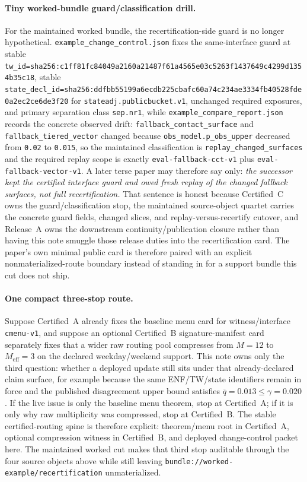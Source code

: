 \documentclass[11pt]{article}
\begin{document}
\paragraph{Tiny worked-bundle guard/classification drill.}
For the maintained worked bundle, the recertification-side guard is no longer hypothetical.
\texttt{example\_change\_control.json} fixes the same-interface guard at stable \texttt{tw\_id=sha256:c1ff81fc84049a2160a21487f61a4565e03c5263f1437649c4299d1354b35c18}, stable \texttt{state\_decl\_id=sha256:ddfbb55199a6ecdb225cbafc60a74c234ae3334fb40528fde0a2ec2ce6de3f20} for \texttt{stateadj.publicbucket.v1}, unchanged required exposures, and primary separation class \texttt{sep.nr1}, while \texttt{example\_compare\_report.json} records the concrete observed drift: \texttt{fallback\_contact\_surface} and \texttt{fallback\_tiered\_vector} changed because \texttt{obs\_model.p\_obs\_upper} decreased from \texttt{0.02} to \texttt{0.015}, so the maintained classification is \texttt{replay\_changed\_surfaces} and the required replay scope is exactly \texttt{eval-fallback-cct-v1} plus \texttt{eval-fallback-vector-v1}.
A later terse paper may therefore say only: \emph{the successor kept the certified interface guard and owed fresh replay of the changed fallback surfaces, not full recertification.}
That sentence is honest because Certified~C owns the guard/classification stop, the maintained source-object quartet carries the concrete guard fields, changed slices, and replay-versus-recertify cutover, and Release~A owns the downstream continuity/publication closure rather than having this note smuggle those release duties into the recertification card. The paper's own minimal public card is therefore paired with an explicit nonmaterialized-route boundary instead of standing in for a support bundle this cut does not ship.\cite{series:workedexample,series:releaseA}

\paragraph{One compact three-stop route.}
Suppose Certified~A already fixes the baseline menu card for witness/interface \texttt{cmenu-v1}, and suppose an optional Certified~B signature-manifest card separately fixes that a wider raw routing pool compresses from $M=12$ to $M_{\mathrm{eff}}=3$ on the declared weekday/weekend support.
This note owns only the third question: whether a deployed update still sits under that already-declared claim surface, for example because the same ENF/TW/state identifiers remain in force and the published disagreement upper bound satisfies $\overline q=0.013\le \gamma=0.020$.
If the live issue is only the baseline menu theorem, stop at Certified~A; if it is only why raw multiplicity was compressed, stop at Certified~B.
The stable certified-routing spine is therefore explicit: theorem/menu root in Certified~A, optional compression witness in Certified~B, and deployed change-control packet here. The maintained worked cut makes that third stop auditable through the four source objects above while still leaving 
\nolinkurl{bundle://worked-example/recertification} unmaterialized.\cite{series:menus,series:sigcomp,series:workedexample}
\end{document}

